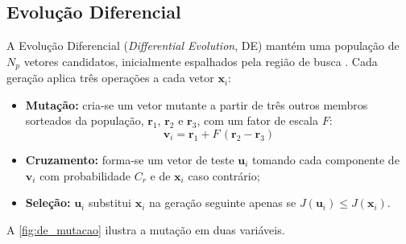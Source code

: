 \subsection{Evolução Diferencial}
\label{sec:evolucao_diferencial}

A Evolução Diferencial (\textit{Differential Evolution}, DE) mantém uma
população de $N_p$ vetores candidatos, inicialmente espalhados pela região de
busca \cite{storn1997differential}. Cada geração aplica três operações a cada
vetor $\mathbf{x}_i$:

\begin{itemize}
    \item \textbf{Mutação:} cria-se um vetor mutante a partir de três outros
    membros sorteados da população, $\mathbf{r}_1$, $\mathbf{r}_2$ e
    $\mathbf{r}_3$, com um fator de escala $F$:
    \begin{equation}
        \mathbf{v}_i = \mathbf{r}_1 + F\,(\mathbf{r}_2 - \mathbf{r}_3)
        \label{eq:de_mutacao}
    \end{equation}
    \item \textbf{Cruzamento:} forma-se um vetor de teste $\mathbf{u}_i$
    tomando cada componente de $\mathbf{v}_i$ com probabilidade $C_r$ e de
    $\mathbf{x}_i$ caso contrário;
    \item \textbf{Seleção:} $\mathbf{u}_i$ substitui $\mathbf{x}_i$ na geração
    seguinte apenas se $J(\mathbf{u}_i) \le J(\mathbf{x}_i)$.
\end{itemize}

\noindent A \autoref{fig:de_mutacao} ilustra a mutação em duas variáveis.

